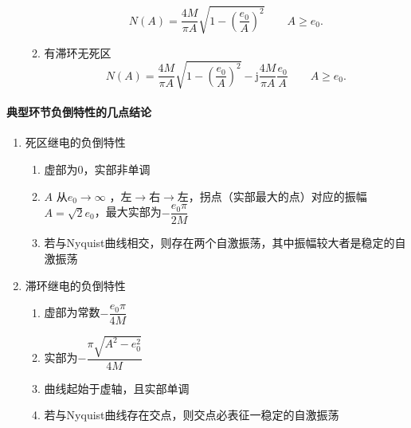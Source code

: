 \documentclass[14pt,a4paper]{article}
\theoremstyle{plain}
\theoremstyle{definition}
\theoremstyle{remark}
\theoremstyle{plain}
\theoremstyle{plain}
\theoremstyle{plain}
\theoremstyle{definition}
\theoremstyle{remark}
\numberwithin{equation}{section}
\begin{document}
\begin{enumerate}
\begin{enumerate}
\begin{equation}
                                \label{eq:deadzoneRelay}
                                N(A) = \dfrac{4M}{\pi A} \sqrt{1-\left( \dfrac{e_0}{A} \right)^2 } \quad  \quad A \ge e_0 
                                .\end{equation} 
                            \item 有滞环无死区
                                \begin{equation}
                                \label{eq:backlashRelay}
                                N(A) = \dfrac{4M}{\pi A} \sqrt{1-\left( \dfrac{e_0}{A} \right)^2 } - \mathrm j \dfrac{4M}{\pi A} \dfrac{e_0}{A} \quad  \quad A \ge e_0 
                                .\end{equation} 
                        \end{enumerate}
				\end{enumerate} 

                \paragraph{典型环节负倒特性的几点结论}%
                \label{par:典型环节负倒特性的几点结论}
                
                    \begin{enumerate}
                        \item 死区继电的负倒特性 
                            \begin{enumerate}
                                \item 虚部为0，实部非单调 
                                \item $A$ 从$e_0\to \infty$ ，左$\to $右$\to $左，拐点（实部最大的点）对应的振幅$A=\sqrt{2} e_0$，最大实部为$-\dfrac{e_0\pi}{2M}$ 
                                \item 若与Nyquist曲线相交，则存在两个自激振荡，其中振幅较大者是稳定的自激振荡 
                            \end{enumerate} 
                        \item 滞环继电的负倒特性
                            \begin{enumerate}
                                \item 虚部为常数$-\dfrac{e_0\pi}{4M}$ 
                                \item 实部为$-\dfrac{\pi \sqrt{A^2-e_0^2}}{4M}$ 
                                \item 曲线起始于虚轴，且实部单调
                                \item 若与Nyquist曲线存在交点，则交点必表征一稳定的自激振荡 
                            \end{enumerate} 
                    \end{enumerate} 
	        
\end{document}
